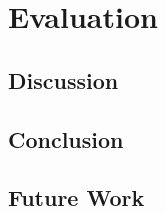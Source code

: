 \chapter{Evaluation}\label{chap:evaluation}

\section{Discussion}

\section{Conclusion}

\section{Future Work}